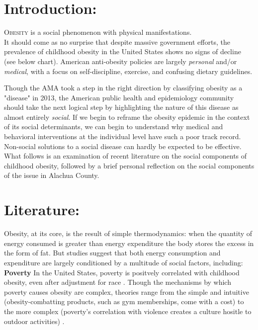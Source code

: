 \begin{multicols}{2} %

\section*{Introduction: }

\lettrine[nindent=0em,lines=3]{O}{besity} is a social phenomenon with physical manifestations. \\

It should come as no surprise that despite massive government efforts, the prevalence of childhood obesity in the United States shows no signs of decline \cite{Ogden2014} (see below chart).  American anti-obesity policies are largely \emph{personal} and/or \emph{medical}, with a focus on self-discipline, exercise, and confusing dietary guidelines.  \\

\cite{NIH}

Though the AMA took a step in the right direction by classifying obesity as a "disease" in 2013, %
the American public health and epidemiology community should take the next logical step by highlighting the nature of this disease as almost entirely \emph{social}.  If we begin to reframe the obesity epidemic in the context of its social determinants, we can begin to understand why medical and behavioral interventions at the individual level have such a poor track record. Non-social solutions to a social disease can hardly be expected to be effective. \\

What follows is an examination of recent literature on the social components of childhood obesity, followed by a brief personal reflection on the social components of the issue in Alachua County.

\section*{Literature: }

Obesity, at its core, is the result of simple thermodynamics: when the quantity of energy consumed is greater than energy expenditure the body stores the excess in the form of fat.  But studies suggest that both energy consumption and expenditure are largely conditioned by a multitude of social factors, including:\\

\textbf{Poverty} In the United States, poverty is positvely correlated with childhood obesity, even after adjustment for race \cite{Pan2012}.  Though the mechanisms by which poverty causes obesity are complex, theories range from the simple and intuitive (obesity-combatting products, such as gym memberships, come with a cost) to the more complex (poverty's correlation with violence creates a culture hositle to outdoor activities) \cite{Levine2011}.  \\


\end{multicols}
